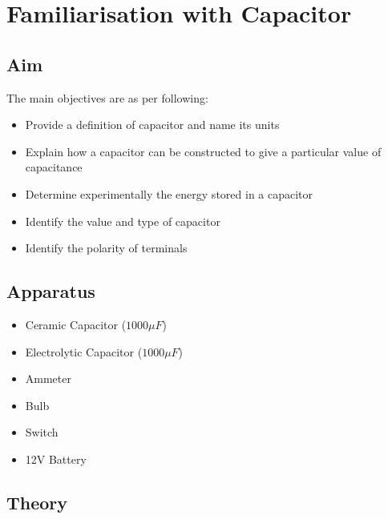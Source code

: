 \chapter{Familiarisation with Capacitor}

\section{Aim}
	The main objectives are as per following:
	\begin{itemize}
		\tightlist
		\item Provide a definition of capacitor and name its units
		\item Explain how a capacitor can be constructed to give a particular value of capacitance
		\item Determine experimentally the energy stored in a capacitor
		\item Identify the value and type of capacitor
		\item Identify the polarity of terminals
	\end{itemize}

\section{Apparatus}
	\begin{itemize}
		\tightlist
		\item Ceramic Capacitor ($1000\mu F$)
		\item Electrolytic Capacitor ($1000 \mu F$)
		\item Ammeter
		\item Bulb
		\item Switch
		\item 12V Battery
	\end{itemize}

\section{Theory}
